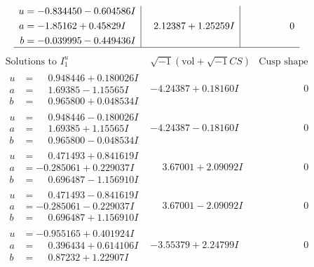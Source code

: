 \documentclass[1p]{elsarticle_modified}
\theoremstyle{definition}
\newcommand{\I}{\sqrt{-1}}
\begin{document}
$$\begin{array}{c|c|c}
\begin{aligned}
u &= -0.834450 - 0.604586 I \\
a &= -1.85162 + 0.45829 I \\
b &= -0.039995 - 0.449436 I\end{aligned}
 & \phantom{-}2.12387 + 1.25259 I & \phantom{-0.000000 } 0\\
 \hline 
 \end{array}$$\newpage$$\begin{array}{c|c|c}  
\text{Solutions to }I^u_{1}& \I (\text{vol} + \sqrt{-1}CS) & \text{Cusp shape}\\
 \hline 
\begin{aligned}
u &= \phantom{-}0.948446 + 0.180026 I \\
a &= \phantom{-}1.69385 - 1.15565 I \\
b &= \phantom{-}0.965800 + 0.048534 I\end{aligned}
 & -4.24387 + 0.18160 I & \phantom{-0.000000 } 0 \\ \hline\begin{aligned}
u &= \phantom{-}0.948446 - 0.180026 I \\
a &= \phantom{-}1.69385 + 1.15565 I \\
b &= \phantom{-}0.965800 - 0.048534 I\end{aligned}
 & -4.24387 - 0.18160 I & \phantom{-0.000000 } 0 \\ \hline\begin{aligned}
u &= \phantom{-}0.471493 + 0.841619 I \\
a &= -0.285061 + 0.229037 I \\
b &= \phantom{-}0.696487 - 1.156910 I\end{aligned}
 & \phantom{-}3.67001 + 2.09092 I & \phantom{-0.000000 } 0 \\ \hline\begin{aligned}
u &= \phantom{-}0.471493 - 0.841619 I \\
a &= -0.285061 - 0.229037 I \\
b &= \phantom{-}0.696487 + 1.156910 I\end{aligned}
 & \phantom{-}3.67001 - 2.09092 I & \phantom{-0.000000 } 0 \\ \hline\begin{aligned}
u &= -0.955165 + 0.401924 I \\
a &= \phantom{-}0.396434 + 0.614106 I \\
b &= \phantom{-}0.87232 + 1.22907 I\end{aligned}
 & -3.55379 + 2.24799 I & \phantom{-0.000000 } 0 \\ \hline\begin{aligned}

\end{aligned}
\end{array}$$
\end{document}
